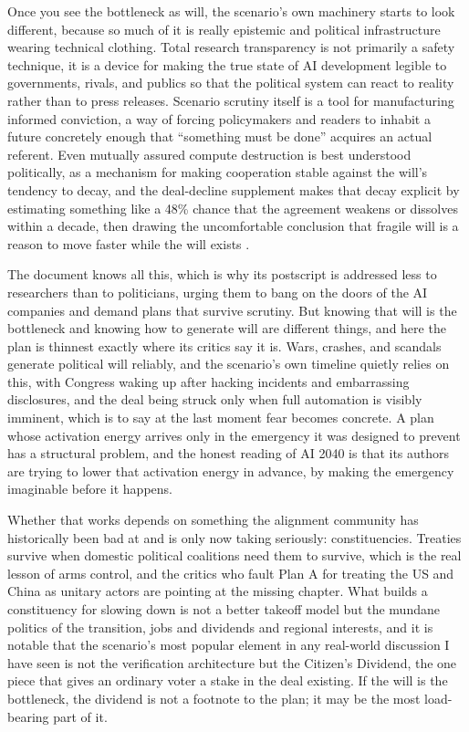 \documentclass[11pt,letterpaper]{article}
\begin{document}
Once you see the bottleneck as will, the scenario's own machinery starts to look different, because so much of it is really epistemic and political infrastructure wearing technical clothing. Total research transparency is not primarily a safety technique, it is a device for making the true state of AI development legible to governments, rivals, and publics so that the political system can react to reality rather than to press releases. Scenario scrutiny itself is a tool for manufacturing informed conviction, a way of forcing policymakers and readers to inhabit a future concretely enough that ``something must be done'' acquires an actual referent. Even mutually assured compute destruction is best understood politically, as a mechanism for making cooperation stable against the will's tendency to decay, and the deal-decline supplement makes that decay explicit by estimating something like a 48\% chance that the agreement weakens or dissolves within a decade, then drawing the uncomfortable conclusion that fragile will is a reason to move faster while the will exists \citep{supplements}.

The document knows all this, which is why its postscript is addressed less to researchers than to politicians, urging them to bang on the doors of the AI companies and demand plans that survive scrutiny. But knowing that will is the bottleneck and knowing how to generate will are different things, and here the plan is thinnest exactly where its critics say it is. Wars, crashes, and scandals generate political will reliably, and the scenario's own timeline quietly relies on this, with Congress waking up after hacking incidents and embarrassing disclosures, and the deal being struck only when full automation is visibly imminent, which is to say at the last moment fear becomes concrete. A plan whose activation energy arrives only in the emergency it was designed to prevent has a structural problem, and the honest reading of AI 2040 is that its authors are trying to lower that activation energy in advance, by making the emergency imaginable before it happens.

Whether that works depends on something the alignment community has historically been bad at and is only now taking seriously: constituencies. Treaties survive when domestic political coalitions need them to survive, which is the real lesson of arms control, and the critics who fault Plan A for treating the US and China as unitary actors are pointing at the missing chapter. What builds a constituency for slowing down is not a better takeoff model but the mundane politics of the transition, jobs and dividends and regional interests, and it is notable that the scenario's most popular element in any real-world discussion I have seen is not the verification architecture but the Citizen's Dividend, the one piece that gives an ordinary voter a stake in the deal existing. If the will is the bottleneck, the dividend is not a footnote to the plan; it may be the most load-bearing part of it.
\end{document}
